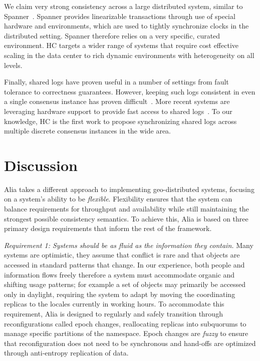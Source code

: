 \documentclass[11pt,conference]{IEEEtran}
\begin{document}
We claim very strong consistency across a large distributed system, similar
to Spanner~\cite{spanner}.
Spanner provides linearizable  transactions through use of special hardware
and environments, which are used to tightly synchronize clocks in the
distributed setting.
Spanner therefore relies on a very specific, curated environment.
HC targets a wider range of systems that require cost effective scaling in
the data center to rich dynamic environments with heterogeneity on all levels.

Finally, shared logs have proven useful in a number of settings from fault
tolerance to correctness guarantees.
However, keeping such logs consistent in even a single consensus instance has
proven difficult~\cite{chubby,gfs,zookeeper}.
More recent systems are leveraging hardware support to provide fast access to
shared logs~\cite{vcorfu,tango,calvindb,calvinfs,hyder-a,fawn}.
To our knowledge, HC is the first work to propose synchronizing shared logs
across multiple discrete consensus instances in the wide area.


\section{Discussion}

Alia takes a different approach to implementing geo-distributed systems, focusing
on a system's ability to be \emph{flexible}.
Flexibility ensures that the system can balance requirements for throughput and
availability while still maintaining the strongest possible consistency semantics.
To achieve this, Alia is based on three primary design requirements that inform the
rest of the framework.

\emph{Requirement 1: Systems should be as fluid as the information they contain.}
Many systems are optimistic, they assume that conflict is rare and that objects are
accessed in standard patterns that change.
In our experience, both people and information flows freely therefore a system must
accommodate organic and shifting usage patterns; for example a set of objects may
primarily be accessed only in daylight, requiring the system to adapt by moving the
coordinating replicas to the locales currently in working hours.
To accommodate this requirement, Alia is designed to regularly and safely transition
through reconfigurations called epoch changes, reallocating replicas into subquorums
to manage specific partitions of the namespace.
Epoch changes are \emph{fuzzy} to ensure that reconfiguration does not need to be
synchronous and hand-offs are optimized through anti-entropy replication of data.
\end{document}

